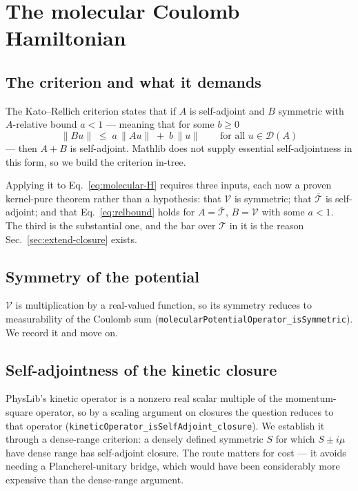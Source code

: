 \documentclass[aps,prd,reprint,nofootinbib,superscriptaddress]{revtex4-2}
\newcommand{\thm}[1]{\texttt{#1}}   %
\begin{document}
\section{The molecular Coulomb Hamiltonian}
\label{sec:molecular}

\subsection{The criterion and what it demands}

The Kato--Rellich criterion states that if $A$ is self-adjoint and $B$ symmetric with $A$-relative
bound $a<1$ --- meaning that for some $b\ge0$
\begin{equation}
\|Bu\| \;\le\; a\,\|Au\| \;+\; b\,\|u\|
\qquad \text{for all } u\in\mathcal{D}(A)
\label{eq:relbound}
\end{equation}
--- then $A+B$ is self-adjoint. Mathlib does not supply essential self-adjointness in this form, so
we build the criterion in-tree.

Applying it to Eq.~\eqref{eq:molecular-H} requires three inputs, each now a proven kernel-pure
theorem rather than a hypothesis: that $\mathcal{V}$ is symmetric; that $\overline{\mathcal{T}}$ is
self-adjoint; and that Eq.~\eqref{eq:relbound} holds for $A=\overline{\mathcal{T}}$,
$B=\mathcal{V}$ with some $a<1$. The third is the substantial one, and the bar over $\mathcal{T}$ in
it is the reason Sec.~\ref{sec:extend-closure} exists.

\subsection{Symmetry of the potential}

$\mathcal{V}$ is multiplication by a real-valued function, so its symmetry reduces to measurability
of the Coulomb sum (\thm{molecularPotentialOperator\_isSymmetric}). We record it and move on.

\subsection{Self-adjointness of the kinetic closure}

PhysLib's kinetic operator is a nonzero real scalar multiple of the momentum-square operator, so by a
scaling argument on closures the question reduces to that operator
(\thm{kineticOperator\_isSelfAdjoint\_closure}). We establish it through a dense-range criterion: a
densely defined symmetric $S$ for which $S\pm i\mu$ have dense range has self-adjoint closure. The
route matters for cost --- it avoids needing a Plancherel-unitary bridge, which would have been
considerably more expensive than the dense-range argument.
\end{document}
